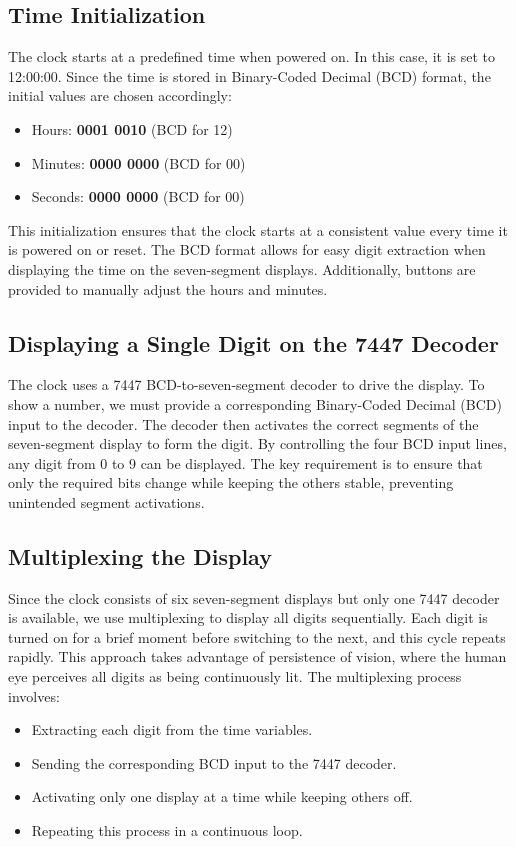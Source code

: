 \documentclass[12pt]{article}
\begin{document}
	\subsection*{Time Initialization}
	The clock starts at a predefined time when powered on. In this case, it is set to 12:00:00. Since the time is stored in Binary-Coded Decimal (BCD) format, the initial values are chosen accordingly:
	\begin{itemize}
		\item Hours: \textbf{0001 0010} (BCD for 12)
		\item Minutes: \textbf{0000 0000} (BCD for 00)
		\item Seconds: \textbf{0000 0000} (BCD for 00)
	\end{itemize}
	This initialization ensures that the clock starts at a consistent value every time it is powered on or reset. The BCD format allows for easy digit extraction when displaying the time on the seven-segment displays. Additionally, buttons are provided to manually adjust the hours and minutes.
	
	\subsection*{Displaying a Single Digit on the 7447 Decoder}
	The clock uses a 7447 BCD-to-seven-segment decoder to drive the display. To show a number, we must provide a corresponding Binary-Coded Decimal (BCD) input to the decoder. The decoder then activates the correct segments of the seven-segment display to form the digit. By controlling the four BCD input lines, any digit from 0 to 9 can be displayed. The key requirement is to ensure that only the required bits change while keeping the others stable, preventing unintended segment activations.
	
	\subsection*{Multiplexing the Display}
	Since the clock consists of six seven-segment displays but only one 7447 decoder is available, we use multiplexing to display all digits sequentially. Each digit is turned on for a brief moment before switching to the next, and this cycle repeats rapidly. This approach takes advantage of persistence of vision, where the human eye perceives all digits as being continuously lit. The multiplexing process involves:
	\begin{itemize}
		\item Extracting each digit from the time variables.
		\item Sending the corresponding BCD input to the 7447 decoder.
		\item Activating only one display at a time while keeping others off.
		\item Repeating this process in a continuous loop.
	\end{itemize}
	
\end{document}
